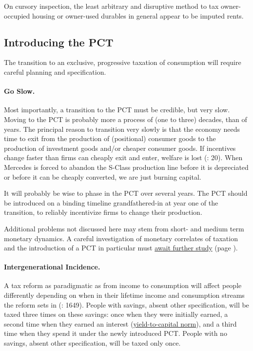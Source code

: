 On cursory inspection, the least arbitrary and disruptive method to tax owner-occupied housing or owner-used durables in general appear to be imputed rents. 

\subsection{Introducing the PCT} The transition to an exclusive, progressive taxation of consumption will require careful planning and specification.

\paragraph{Go Slow.}  \label{sec:GoSlow} Most importantly, a transition to the PCT must be credible, but very slow. Moving to the PCT is probably more a process of (one to three) decades, than of years. The principal reason to transition very slowly is that the economy needs time to exit from the production of (positional) consumer goods to the production of investment goods and/or cheaper consumer goods. If incentives change faster than firms can cheaply exit and enter, welfare is lost (\citealt{Seidman1997}: 20). When Mercedes is forced to abandon the S-Class production line before it is depreciated or before it can be cheaply converted, we are just burning capital.

It will probably be wise to phase in the PCT over several years. The PCT should be introduced on a binding timeline grandfathered-in at year one of the transition, to reliably incentivize firms to change their production.

Additional problems not discussed here may stem from short- and medium term monetary dynamics. A careful investigation of monetary correlates of taxation and the introduction of a PCT in particular must \hyperref[sec:LooseEnds]{await further study} (page \pageref{sec:LooseEnds}).

\paragraph{Intergenerational Incidence.}  \label{sec:IntergenerationalIncidence} A tax reform as paradigmatic as from income to consumption will affect people differently depending on when in their lifetime income and consumption streams the reform sets in (\citealt{Graetz2009}: 1649). People with savings, absent other specification, will be taxed three times on these savings: once when they were initially earned, a second time when they earned an interest (\hyperref[sec:Y2C]{yield-to-capital norm}), and a third time when they spend it under the newly introduced PCT. People with no savings, absent other specification, will be taxed only once.

